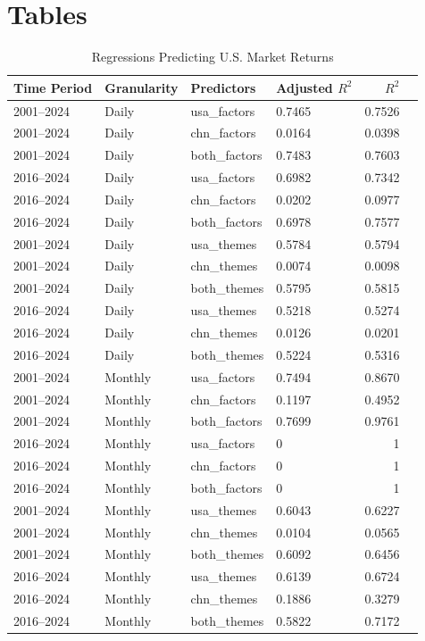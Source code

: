 \chapter{Tables}
\label{AppendixA}

\begin{table}[htbp]
\centering
\caption{Regressions Predicting U.S. Market Returns}
\label{tab:usa_market_regression_summary}
\begin{tabular}{@{}llllrr@{}}
\toprule
Time Period & Granularity & Predictors & Adjusted $R^2$ & $R^2$ \\ \midrule
2001--2024 & Daily   & usa\_factors  & 0.7465  & 0.7526 \\
2001--2024 & Daily   & chn\_factors  & 0.0164  & 0.0398 \\
2001--2024 & Daily   & both\_factors & 0.7483  & 0.7603 \\
2016--2024 & Daily   & usa\_factors  & 0.6982  & 0.7342 \\
2016--2024 & Daily   & chn\_factors  & 0.0202  & 0.0977 \\
2016--2024 & Daily   & both\_factors & 0.6978  & 0.7577 \\
2001--2024 & Daily   & usa\_themes   & 0.5784  & 0.5794 \\
2001--2024 & Daily   & chn\_themes   & 0.0074  & 0.0098 \\
2001--2024 & Daily   & both\_themes  & 0.5795  & 0.5815 \\
2016--2024 & Daily   & usa\_themes   & 0.5218  & 0.5274 \\
2016--2024 & Daily   & chn\_themes   & 0.0126  & 0.0201 \\
2016--2024 & Daily   & both\_themes  & 0.5224  & 0.5316 \\
2001--2024 & Monthly & usa\_factors  & 0.7494  & 0.8670 \\
2001--2024 & Monthly & chn\_factors  & 0.1197  & 0.4952 \\
2001--2024 & Monthly & both\_factors & 0.7699  & 0.9761 \\
2016--2024 & Monthly & usa\_factors  & 0  & 1 \\
2016--2024 & Monthly & chn\_factors  & 0  & 1 \\
2016--2024 & Monthly & both\_factors & 0  & 1 \\
2001--2024 & Monthly & usa\_themes   & 0.6043  & 0.6227 \\
2001--2024 & Monthly & chn\_themes   & 0.0104  & 0.0565 \\
2001--2024 & Monthly & both\_themes  & 0.6092  & 0.6456 \\
2016--2024 & Monthly & usa\_themes   & 0.6139  & 0.6724 \\
2016--2024 & Monthly & chn\_themes   & 0.1886  & 0.3279 \\
2016--2024 & Monthly & both\_themes  & 0.5822  & 0.7172 \\ \bottomrule
\end{tabular}
\end{table}


